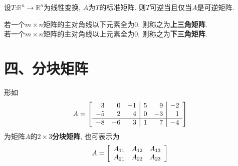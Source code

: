 \begin{theorem}
设$T$:$\mathbb{R}^n\rightarrow\mathbb{R}^n$为线性变换, $A$为$T$的标准矩阵. 则$T$可逆当且仅当$A$是可逆矩阵.
\end{theorem}\vspace{4ex}

若一个$m\times n$矩阵的主对角线以下元素全为0, 则称之为\textbf{上三角矩阵}.\\[1ex]
若一个$m\times n$矩阵的主对角线以上元素全为0, 则称之为\textbf{下三角矩阵}.\\[4ex]

\section{四、分块矩阵}
形如
\[A=\left[
\begin{array}{r r r|r r|r}
3 & 0 & -1 & 5 & 9 & -2\\
-5 & 2 & 4 & 0 & -3 & 1\\\hline
-8 & -6 & 3 & 1 & 7 & -4
\end{array}
\right]\]
为矩阵$A$的$2\times 3$\textbf{分块矩阵}, 也可表示为
\[A=\left[
\begin{array}{l l l}
A_{11} & A_{12} & A_{13}\\
A_{21} & A_{22} & A_{23}
\end{array}
\right]\]\\[2ex]

